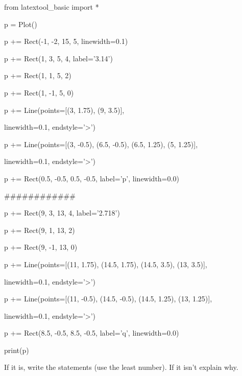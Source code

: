 \begin{python}

from latextool_basic import *

p = Plot()



p += Rect(-1, -2, 15, 5, linewidth=0.1)



p += Rect(1, 3, 5, 4, label='3.14')

p += Rect(1, 1, 5, 2)

p += Rect(1, -1, 5, 0)



p += Line(points=[(3, 1.75), (9, 3.5)],

          linewidth=0.1, endstyle='>')

p += Line(points=[(3, -0.5), (6.5, -0.5), (6.5, 1.25), (5, 1.25)],

          linewidth=0.1, endstyle='>')



p += Rect(0.5, -0.5, 0.5, -0.5, label='p', linewidth=0.0)

############



p += Rect(9, 3, 13, 4, label='2.718')

p += Rect(9, 1, 13, 2)

p += Rect(9, -1, 13, 0)



p += Line(points=[(11, 1.75), (14.5, 1.75), (14.5, 3.5), (13, 3.5)],

          linewidth=0.1, endstyle='>')

p += Line(points=[(11, -0.5), (14.5, -0.5), (14.5, 1.25), (13, 1.25)],

          linewidth=0.1, endstyle='>')



p += Rect(8.5, -0.5, 8.5, -0.5, label='q', linewidth=0.0)



print(p)

\end{python}



If it is, write the statements (use the least number). If it isn't explain why.

